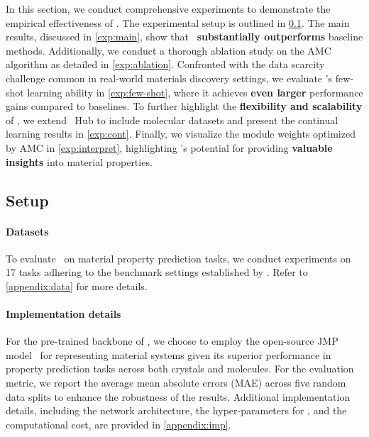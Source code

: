 In this section, we conduct comprehensive experiments to demonstrate the empirical effectiveness of \name. The experimental setup is outlined in \cref{exp:setup}. The main results, discussed in \cref{exp:main}, show that \name \ \textbf{substantially outperforms} baseline methods. Additionally, we conduct a thorough ablation study on the AMC algorithm as detailed in \cref{exp:ablation}.
Confronted with the data scarcity challenge common in real-world materials discovery settings, we evaluate \name’s few-shot learning ability in \cref{exp:few-shot}, where it achieves \textbf{even larger} performance gains compared to baselines.
To further highlight the \textbf{flexibility and scalability} of \name, we extend \name \ Hub to include molecular datasets and present the continual learning results in \cref{exp:cont}. Finally, we visualize the module weights optimized by AMC in \cref{exp:interpret}, highlighting \name’s potential for providing \textbf{valuable insights} into material properties.


\subsection{Setup}
\label{exp:setup}
\paragraph{Datasets}
To evaluate \name \ on material property prediction tasks, we conduct experiments on 17 tasks adhering to the benchmark settings established by \citet{chang2022towards}. Refer to \cref{appendix:data} for more details.

\paragraph{Implementation details}
For the pre-trained backbone of \name, we choose to employ the open-source JMP model~\citep{shoghi2023molecules} for representing material systems given its superior performance in property prediction tasks across both crystals and molecules.
For the evaluation metric, we report the average mean absolute errors (MAE) across five random data splits to enhance the robustness of the results.
Additional implementation details, including the network architecture, the hyper-parameters for \name, and the computational cost, are provided in \cref{appendix:imp}.
 
